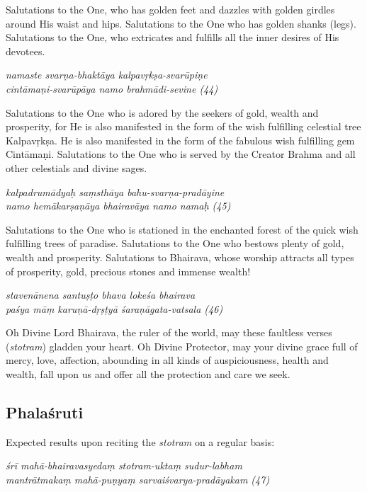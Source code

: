 \documentclass[11pt,oneside,a4paper]{article}
\newenvironment{shloka}[1]
  {\bigskip\center#1\varwidth{\linewidth}}
  {\endvarwidth\endcenter\bigskip}
\newcommand{\tl}[1]{\emph{#1}}
\begin{document}
Salutations to the One, who has golden feet and dazzles with golden girdles
around His waist and hips. Salutations to the One who has golden shanks (legs).
Salutations to the One, who extricates and fulfills all the inner desires of
His devotees.

\begin{shloka}\itshape
  namaste svarṇa-bhaktāya kalpavṛkṣa-svarūpiṇe\\
  cintāmaṇi-svarūpāya namo brahmādi-sevine (44)
\end{shloka}

Salutations to the One who is adored by the seekers of gold, wealth and
prosperity, for He is also manifested in the form of the wish fulfilling
celestial tree Kalpavṛkṣa. He is also manifested in the form of the fabulous
wish fulfilling gem Cintāmaṇi. Salutations to the One who is served by
the Creator Brahma and all other celestials and divine sages.

\begin{shloka}\itshape
  kalpadrumādyaḥ saṃsthāya bahu-svarṇa-pradāyine\\
  namo hemākarṣaṇāya bhairavāya namo namaḥ (45)
\end{shloka}

Salutations to the One who is stationed in the enchanted forest of the quick
wish fulfilling trees of paradise. Salutations to the One who bestows plenty of
gold, wealth and prosperity. Salutations to Bhairava, whose worship attracts all
types of prosperity, gold, precious stones and immense wealth!

\begin{shloka}\itshape
  stavenānena santuṣṭo bhava lokeśa bhairava\\
  paśya māṃ karuṇā-dṛṣṭyā śaraṇāgata-vatsala (46)
\end{shloka}

Oh Divine Lord Bhairava, the ruler of the world, may these faultless verses
(\tl{stotram}) gladden your heart. Oh Divine Protector, may your divine grace
full of mercy, love, affection, abounding in all kinds of auspiciousness, health
and wealth, fall upon us and offer all the protection and care we seek.

\subsection{Phalaśruti}

Expected results upon reciting the \tl{stotram} on a regular basis:

\begin{shloka}\itshape
  śrī mahā-bhairavasyedaṃ stotram-uktaṃ sudur-labham\\
  mantrātmakaṃ mahā-puṇyaṃ sarvaiśvarya-pradāyakam (47)
\end{shloka}
\end{document}
